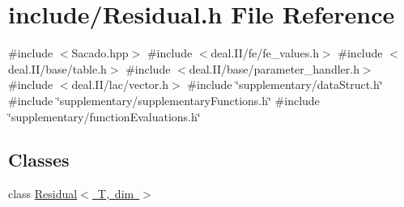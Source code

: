 \section{include/\+Residual.h File Reference}
\label{_residual_8h}
{\ttfamily \#include $<$Sacado.\+hpp$>$}\newline
{\ttfamily \#include $<$deal.\+I\+I/fe/fe\+\_\+values.\+h$>$}\newline
{\ttfamily \#include $<$deal.\+I\+I/base/table.\+h$>$}\newline
{\ttfamily \#include $<$deal.\+I\+I/base/parameter\+\_\+handler.\+h$>$}\newline
{\ttfamily \#include $<$deal.\+I\+I/lac/vector.\+h$>$}\newline
{\ttfamily \#include \char`\"{}supplementary/data\+Struct.\+h\char`\"{}}\newline
{\ttfamily \#include \char`\"{}supplementary/supplementary\+Functions.\+h\char`\"{}}\newline
{\ttfamily \#include \char`\"{}supplementary/function\+Evaluations.\+h\char`\"{}}\newline
\subsection*{Classes}
\begin{DoxyCompactItemize}
\item 
class \mbox{\hyperlink{class_residual}{Residual$<$ T, dim $>$}}
\end{DoxyCompactItemize}
